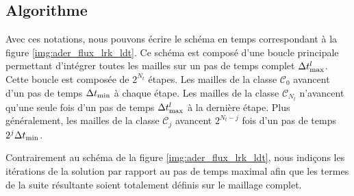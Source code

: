\begin{figure}[!h]
\begin{center}
	\end{center}
\end{figure}


\subsection{Algorithme}
\label{ssect:lts2_implem_algo}

Avec ces notations, nous pouvons écrire le schéma en temps correspondant
à la figure \ref{img:ader_flux_lrk_ldt}. Ce schéma est composé d'une
boucle principale permettant d'intégrer toutes les mailles sur un pas
de temps complet $\Delta t^l_{\max}$. Cette boucle est composée de $2^{N_t}$
étapes. Les mailles de la classe $\mathcal{C}_0$ avancent d'un pas de temps
$\Delta t_{\min}$ à chaque étape. Les mailles de la classe $\mathcal{C}_{N_t}$
n'avancent qu'une seule fois d'un pas de temps $\Delta t^l_{\max}$ à la dernière
étape. Plus généralement, les mailles de la classe $\mathcal{C}_j$ avancent
$2^{N_t - j}$ fois d'un pas de temps $2^j \Delta t_{\min}$.

Contrairement au schéma de la figure \ref{img:ader_flux_lrk_ldt},
nous indiçons les itérations de la solution par rapport au pas de 
temps maximal afin que les termes de la suite résultante soient totalement
définis sur le maillage complet.

